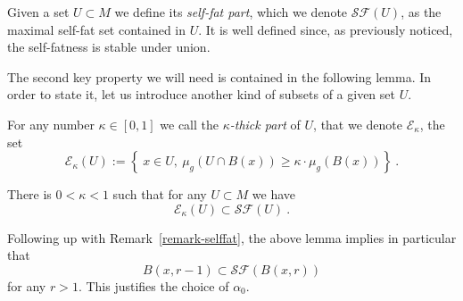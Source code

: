 \documentclass[AHL,Unicode,longabstracts,published]{cedram}
\newcommand{\cE}{\mathcal{E}}
\newcommand{\cSF}{\mathcal{SF}}
\begin{document}
\begin{defi}\label{def-selffatpart}
Given a set $U \subset M$ we define its \emph{self-fat part}, which we denote $\cSF(U)$, as the maximal self-fat set contained in $U$. It is well defined since, as previously noticed, the self-fatness is stable under union.
\end{defi}

The second key property we will need is contained in the following lemma. In order to state it, let us introduce another kind of subsets of a given set $U$.

For any number $ \kappa \in [0,1]$ we call the \emph{$\kappa$-thick part} of $U$, that we denote $\cE_{\kappa}$, the set
\[
\cE_{\kappa}(U) := \left\{ \ x \in U, \ \mu_g\left(U \cap B(x)\right) \ge \kappa \cdot \mu_g(B(x))\right\} \ .
\]

\begin{lemm}\label{lemma-selffatsubset}
There is $0 < \kappa < 1$ such that for any $U \subset M$ we have
\[
\cE_{\kappa}(U) \subset \cSF(U)\ .
\]
\end{lemm}

Following up with Remark~\ref{remark-selffat}, the above lemma implies in particular that
\[
B(x,r-1) \subset \cSF(B(x,r))
\]
for any $r > 1$. This justifies the choice of $\alpha_0$.
\end{document}

